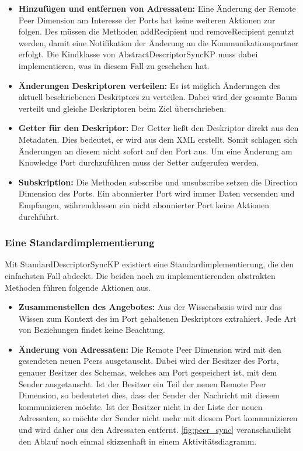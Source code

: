 \documentclass[a4paper]{article}
\begin{document}
	\begin{itemize}
		\item \textbf{Hinzufügen und entfernen von Adressaten:} Eine Änderung
		der Remote Peer Dimension am Interesse der Ports hat keine weiteren
		Aktionen zur folgen. Des müssen die Methoden addRecipient und
		removeRecipient genutzt werden, damit eine Notifikation
		der Änderung an die Kommunikationspartner erfolgt. Die Kindklasse von
		AbstractDescriptorSyncKP muss dabei implementieren, was in diesem
		Fall zu geschehen hat.
		\item \textbf{Änderungen Deskriptoren verteilen:} Es ist möglich 
		Änderungen des aktuell beschriebenen Deskriptors zu verteilen. Dabei 
		wird der gesamte Baum verteilt und gleiche Deskriptoren beim
		Ziel überschrieben.
		\item \textbf{Getter für den Deskriptor:} Der Getter ließt den 
		Deskriptor direkt aus den Metadaten. Dies bedeutet, er wird aus dem XML
		erstellt. Somit schlagen sich Änderungen an diesem nicht sofort auf
		den Port aus. Um eine Änderung am Knowledge Port durchzuführen muss der
		Setter aufgerufen werden.
		\item \textbf{Subskription:} Die Methoden subscribe und unsubscribe setzen
		die Direction Dimension des Ports. Ein abonnierter Port wird immer Daten
		versenden und Empfangen, währenddessen ein nicht abonnierter Port keine
		Aktionen durchführt.
	\end{itemize}
	
	\subsubsection{Eine Standardimplementierung}
	
	Mit StandardDescriptorSyncKP existiert eine Standardimplementierung, die
	den einfachsten Fall abdeckt. Die beiden noch zu implementierenden
	abstrakten Methoden führen folgende Aktionen aus.
	
	\begin{itemize}
		\item \textbf{Zusammenstellen des Angebotes:} Aus der Wissensbasis
		wird nur das Wissen zum Kontext des im Port gehaltenen Deskriptors
		extrahiert. Jede Art von Beziehungen findet keine Beachtung.
		\item \textbf{Änderung von Adressaten:} Die Remote Peer Dimension 
		wird mit den gesendeten neuen Peers ausgetauscht. Dabei wird
		der Besitzer des Ports, genauer Besitzer des Schemas, welches am Port
		gespeichert ist, mit dem Sender ausgetauscht. Ist der Besitzer ein Teil 
		der neuen Remote Peer Dimension, so bedeutetet dies, dass der Sender der
		Nachricht mit diesem kommunizieren möchte. Ist der Besitzer nicht in der
		Liste der neuen Adressaten, so möchte der Sender nicht mehr mit diesem Port
		kommunizieren und wird daher aus den Adressaten entfernt.
		\autoref{fig:peer_sync} veranschaulicht den Ablauf noch einmal
		skizzenhaft in einem Aktivitätsdiagramm.
	\end{itemize}
	
\end{document}

